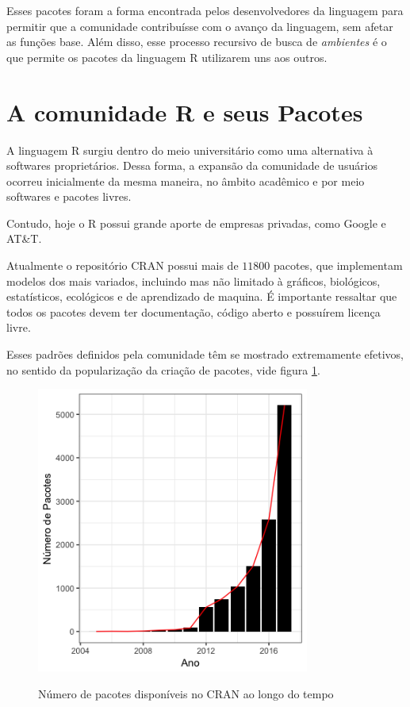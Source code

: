  Esses pacotes foram a forma encontrada pelos desenvolvedores da linguagem para permitir que a comunidade contribuísse com o avanço da linguagem, sem afetar as funções base. Além disso, esse processo recursivo de busca de \textit{ambientes} é o que permite os pacotes da linguagem R utilizarem uns aos outros.

\section{A comunidade R e seus Pacotes}
A linguagem R surgiu dentro do meio universitário como uma alternativa à softwares proprietários. Dessa forma, a expansão da comunidade de usuários ocorreu inicialmente da mesma maneira, no âmbito acadêmico e por meio softwares e pacotes livres. 

Contudo, hoje o R possui grande aporte de empresas privadas, como Google e AT\&T. 



Atualmente o repositório CRAN possui mais de $11800$ pacotes, que implementam modelos dos mais variados, incluindo mas não limitado à gráficos, biológicos, estatísticos, ecológicos e de aprendizado de maquina. É importante ressaltar que todos os pacotes devem ter documentação, código aberto e possuírem licença livre. 

Esses padrões definidos pela comunidade têm se mostrado extremamente efetivos, no sentido da popularização da criação de pacotes, vide figura \ref{fig:RNPackages}.

\begin{figure}[!htb]
	\centering
	\caption{Número de pacotes disponíveis no CRAN ao longo do tempo} 
	\includegraphics[width=0.8\textwidth]{./04-figuras/NRPackages}
	\label{fig:RNPackages}
\end{figure}
